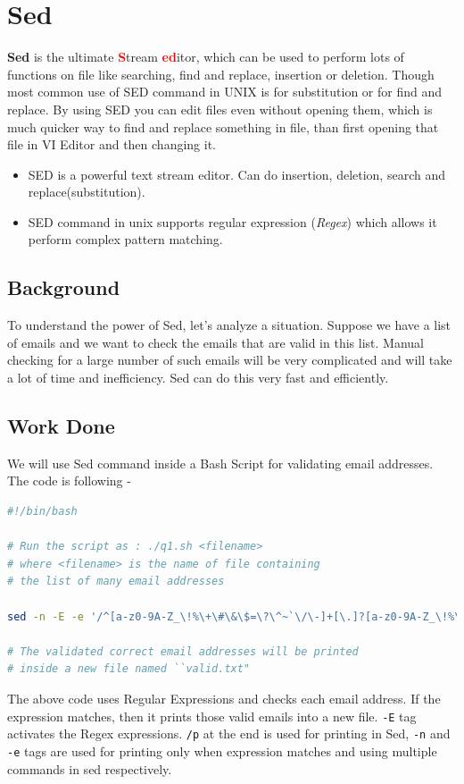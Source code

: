 \documentclass[12pt]{article}
\begin{document}
\section{Sed}
\textbf{Sed}\cite{Sed:7} is the ultimate \textcolor{red}{\textbf{S}}tream \textcolor{red}{\textbf{ed}}itor, which can be used to perform lots of functions on file like searching, find and replace, insertion or deletion. Though most common use of SED command in UNIX\cite{Sed:8} is for substitution or for find and replace. By using SED you can edit files even without opening them, which is much quicker way to find and replace something in file, than first opening that file in VI Editor and then changing it.
\begin{itemize}
    \item SED is a powerful text stream editor. Can do insertion, deletion, search and replace(substitution).
    \item SED command in unix supports regular expression (\textit{Regex}) which allows it perform complex pattern matching.
\end{itemize}

\subsection{Background}
To understand the power of Sed, let's analyze a situation. Suppose we have a list of emails and we want to check the emails that are valid in this list. Manual checking for a large number of such emails will be very complicated and will take a lot of time and inefficiency. Sed can do this very fast and efficiently.

\subsection{Work Done}
We will use Sed command inside a Bash Script for validating email addresses. The code is following -
\begin{lstlisting}[language=bash,caption=Using Sed inside a Bash Script]
#!/bin/bash

# Run the script as : ./q1.sh <filename>
# where <filename> is the name of file containing
# the list of many email addresses

sed -n -E -e '/^[a-z0-9A-Z_\!%\+\#\&\$=\?\^~`\/\-]+[\.]?[a-z0-9A-Z_\!%\+\#\&\$=\?\^~`\/\-]+[@]{1}[a-z]+[\.]{1}[a-z]+$/p' -e '/^[a-z0-9A-Z_\!%\+\#\&\$=\?\^~`\/\-]+[\.]?[a-z0-9A-Z_\!%\+\#\&\$=\?\^~`\/\-]+[@]{1}[a-z]+[\.]{1}[a-z]+[\.]{1}[a-z]+$/p' < $1 > valid.txt

# The validated correct email addresses will be printed
# inside a new file named ``valid.txt"
\end{lstlisting}
\vspace{1 em}
The above code uses Regular Expressions and checks each email address. If the expression matches, then it prints those valid emails into a new file. \texttt{-E} tag activates the Regex expressions. \texttt{/p} at the end is used for printing in Sed, \texttt{-n} and \texttt{-e} tags are used for printing only when expression matches and using multiple commands in sed respectively.
\end{document}
